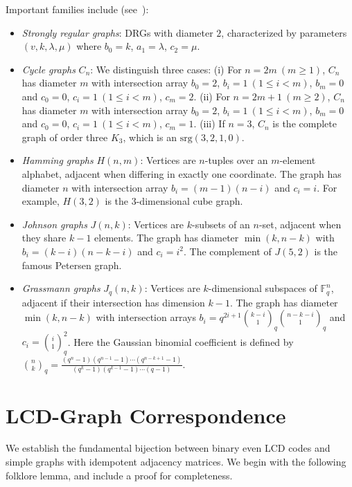 \documentclass[a4paper,11pt]{article}
\theoremstyle{remark}
\newcommand{\FF}{\mathbb{F}}
\begin{document}
Important families include (see~\cite[Chapter~12]{brouwerhaemers2012}):
\begin{itemize}
\item \emph{Strongly regular graphs}: DRGs with diameter $2$, characterized by parameters $(v,k,\lambda,\mu)$ where $b_0 = k$, $a_1 = \lambda$, $c_2 = \mu$.
\item \emph{Cycle graphs} $C_n$:
We distinguish three cases: (i) For $n=2m\ (m \ge 1)$, $C_n$ has diameter $m$ with intersection array $b_0 = 2$, $b_i = 1\ (1\le i < m)$, $b_m = 0$ and $c_0 = 0$, $c_i = 1\ (1\le i < m)$, $c_m = 2$.
(ii) For $n=2m+1\ (m \ge 2)$, $C_n$ has diameter $m$ with intersection array $b_0 = 2$, $b_i = 1\ (1\le i < m)$, $b_m=0$ and $c_0=0$, $c_i = 1\ (1 \le i < m)$, $c_m = 1$.
(iii) If $n=3$, $C_n$ is the complete graph of order three $K_3$, which is an $\text{srg}(3,2,1,0)$.

\item \emph{Hamming graphs} $H(n,m)$: Vertices are $n$-tuples over an $m$-element alphabet, adjacent when differing in exactly one coordinate. The graph has diameter $n$ with intersection array $b_i = (m-1)(n-i)$ and $c_i = i$. For example, $H(3,2)$ is the $3$-dimensional cube graph.
\item \emph{Johnson graphs} $J(n,k)$: Vertices are $k$-subsets of an $n$-set, adjacent when they share $k-1$ elements. The graph has diameter $\min(k, n-k)$ with $b_i = (k-i)(n-k-i)$ and $c_i = i^2$. The complement of $J(5,2)$ is the famous Petersen graph.
\item \emph{Grassmann graphs} $J_q(n,k)$: 
Vertices are $k$-dimensional subspaces of $\FF_q^n$, adjacent if their intersection has dimension $k-1$.
The graph has diameter $\min(k,n-k)$ with intersection arrays
$b_i = q^{2i+1}\binom{k-i}{1}_q \binom{n-k-i}{1}_q$ and $c_i = \binom{i}{1}_q^2$.
Here the Gaussian binomial coefficient is defined by
$\binom{n}{k}_q = \frac{(q^n-1)(q^{n-1}-1)\cdots(q^{n-k+1}-1)}
{(q^k-1)(q^{k-1}-1)\cdots(q-1)}.$
\end{itemize}



\section{LCD-Graph Correspondence}\label{sec:correspondence}

We establish the fundamental bijection between binary even LCD codes and simple graphs with idempotent adjacency matrices.
We begin with the following folklore lemma, and include a proof for completeness.
\end{document}
